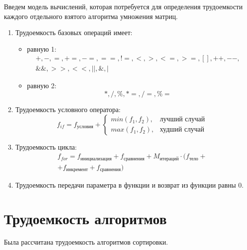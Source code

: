 Введем модель вычислений, которая потребуется для определения трудоемкости каждого отдельного взятого алгоритма умножения матриц.
\begin{enumerate}[label={\arabic*)}]
	\item Трудоемкость базовых операций имеет:
	\begin{itemize}[label=---]
		\item равную 1:
		\begin{equation}
			\label{for:operations_1}
			\begin{gathered}
				+, -, =, +=, -=, ==, !=, <, >, <=, >=, [], ++, {-}-,\\
				\&\&, >>, <<, ||, \&, |
			\end{gathered}
		\end{equation}
		\item равную 2:
		\begin{equation}
			\label{for:operations_2}
			*, /, \%, *=, /=, \%=
		\end{equation}
	\end{itemize}
	\item Трудоемкость условного оператора:
	\begin{equation}
		\label{for:if}
		f_{if} = f_{\text{условия}} + 
		\begin{cases}
			min(f_1, f_2), & \text{лучший случай}\\
			max(f_1, f_2), & \text{худший случай}
		\end{cases}
	\end{equation}
	\item Трудоемкость цикла:
	\begin{equation}
		\label{for:for}
		\begin{gathered}
			f_{for} = f_{\text{инициализация}} + f_{\text{сравнения}} + M_{\text{итераций}} \cdot (f_{\text{тело}} +\\
			+ f_{\text{инкремент}} + f_{\text{сравнения}})
		\end{gathered}
	\end{equation}
	\item Трудоемкость передачи параметра в функции и возврат из функции равны 0.
\end{enumerate}

\section{Трудоемкость алгоритмов}

Была рассчитана трудоемкость алгоритмов сортировки.

